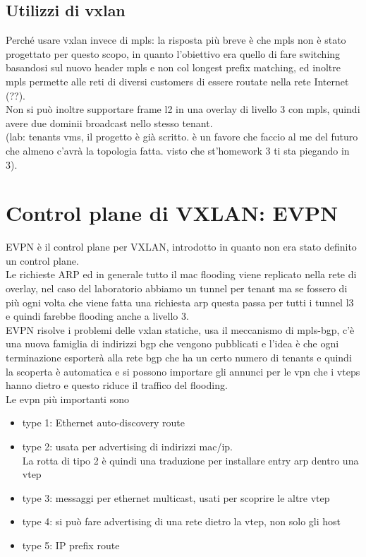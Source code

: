 \documentclass[12pt, oneside]{extbook} %
\begin{document}
\subsection{Utilizzi di vxlan}
Perché usare vxlan invece di mpls: la risposta più breve è che mpls non è stato progettato per questo scopo, in quanto l'obiettivo era quello di fare switching basandosi sul nuovo header mpls e non col longest prefix matching, ed inoltre mpls permette alle reti di diversi customers di essere routate nella rete Internet (??).
\\Non si può inoltre supportare frame l2 in una overlay di livello 3 con mpls, quindi avere due dominii broadcast nello stesso tenant.
\\(lab: tenants vms, il progetto è già scritto. è un favore che faccio al me del futuro che almeno c'avrà la topologia fatta. visto che st'homework 3 ti sta piegando in 3).


\section{Control plane di VXLAN: EVPN}
EVPN è il control plane per VXLAN, introdotto in quanto non era stato definito un control plane.
\\Le richieste ARP ed in generale tutto il mac flooding viene replicato nella rete di overlay, nel caso del laboratorio abbiamo un tunnel per tenant ma se fossero di più ogni volta che viene fatta una richiesta arp questa passa per tutti i tunnel l3 e quindi farebbe flooding anche a livello 3.
\\EVPN risolve i problemi delle vxlan statiche, usa il meccanismo di mpls-bgp, c'è una nuova famiglia di indirizzi bgp che vengono pubblicati e l'idea è che ogni terminazione esporterà alla rete bgp che ha un certo numero di tenants e quindi la scoperta è automatica e si possono importare gli annunci per le vpn che i vteps hanno dietro e questo riduce il traffico del flooding.
\\Le evpn più importanti sono
\begin{itemize}
    \item type 1: Ethernet auto-discovery route
    \item type 2: usata per advertising di indirizzi mac/ip.
    \\La rotta di tipo 2 è quindi una traduzione per installare entry arp dentro una vtep 
    \item type 3: messaggi per ethernet multicast, usati per scoprire le altre vtep
    \item type 4: si può fare advertising di una rete dietro la vtep, non solo gli host
    \item type 5: IP prefix route
\end{itemize}
\end{document}
